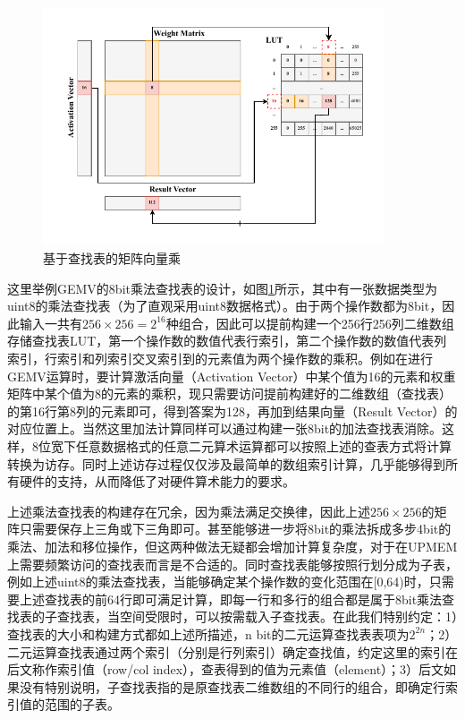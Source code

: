 \begin{figure}[!htbp]
	\centering
    \includegraphics[width=0.9\textwidth]{figures/LUT.pdf}
	\caption{基于查找表的矩阵向量乘}
    \label{LUT}
\end{figure}

这里举例GEMV的8bit乘法查找表的设计，如图\ref{LUT}所示，其中有一张数据类型为uint8的乘法查找表（为了直观采用uint8数据格式）。由于两个操作数都为8bit，因此输入一共有$256\times 256=2^{16}$种组合，因此可以提前构建一个256行256列二维数组存储查找表LUT，第一个操作数的数值代表行索引，第二个操作数的数值代表列索引，行索引和列索引交叉索引到的元素值为两个操作数的乘积。例如在进行GEMV运算时，要计算激活向量（Activation Vector）中某个值为16的元素和权重矩阵中某个值为8的元素的乘积，现只需要访问提前构建好的二维数组（查找表）的第16行第8列的元素即可，得到答案为128，再加到结果向量（Result Vector）的对应位置上。当然这里加法计算同样可以通过构建一张8bit的加法查找表消除。这样，8位宽下任意数据格式的任意二元算术运算都可以按照上述的查表方式将计算转换为访存。同时上述访存过程仅仅涉及最简单的数组索引计算，几乎能够得到所有硬件的支持，从而降低了对硬件算术能力的要求。

上述乘法查找表的构建存在冗余，因为乘法满足交换律，因此上述$256\times 256$的矩阵只需要保存上三角或下三角即可。甚至能够进一步将8bit的乘法拆成多步4bit的乘法、加法和移位操作，但这两种做法无疑都会增加计算复杂度，对于在UPMEM上需要频繁访问的查找表而言是不合适的。同时查找表能够按照行划分成为子表，例如上述uint8的乘法查找表，当能够确定某个操作数的变化范围在[0,64)时，只需要上述查找表的前64行即可满足计算，即每一行和多行的组合都是属于8bit乘法查找表的子查找表，当空间受限时，可以按需载入子查找表。在此我们特别约定：1）查找表的大小和构建方式都如上述所描述，n bit的二元运算查找表表项为$2^{2n}$；2）二元运算查找表通过两个索引（分别是行列索引）确定查找值，约定这里的索引在后文称作索引值（row/col index），查表得到的值为元素值（element）；3）后文如果没有特别说明，子查找表指的是原查找表二维数组的不同行的组合，即确定行索引值的范围的子表。

